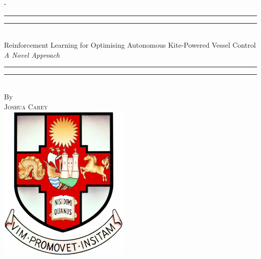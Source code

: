%
%
% 


\begin{titlingpage}
\begin{SingleSpace}
\calccentering{\unitlength} 
\begin{adjustwidth*}{\unitlength}{-\unitlength}
\vspace*{13mm}
\begin{center}
\rule[0.5ex]{\linewidth}{2pt}\vspace*{-\baselineskip}\vspace*{3.2pt}
\rule[0.5ex]{\linewidth}{1pt}\\[\baselineskip]
{\HUGE Reinforcement Learning for Optimising Autonomous Kite-Powered Vessel Control}\\[4mm]
{\Large \textit{A Novel Approach}}\\
\rule[0.5ex]{\linewidth}{1pt}\vspace*{-\baselineskip}\vspace{3.2pt}
\rule[0.5ex]{\linewidth}{2pt}\\
\vspace{6.5mm}
{\large By}\\
\vspace{6.5mm}
{\large\textsc{Joshua Carey}}\\
\vspace{11mm}
\includegraphics[scale=0.6]{logos/bristolcrest_colour}\\

\end{center}
\end{adjustwidth*}
\end{SingleSpace}
\end{titlingpage}
